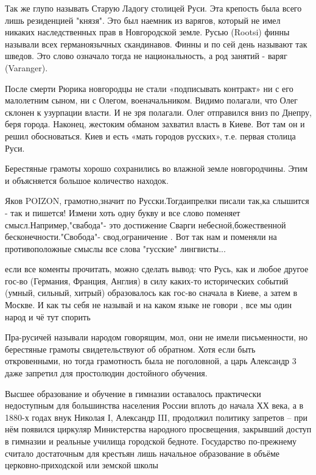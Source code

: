 \begin{itemize}
Так же глупо называть Старую Ладогу столицей Руси. Эта крепость была всего лишь
резиденцией "князя". Это был наемник из варягов, который не имел никаких
наследственных прав в Новгородской земле. Русью (Rootsi) финны называли всех
германоязычных скандинавов. Финны и по сей день называют так шведов. Это слово
означало тогда не национальность, а род занятий - варяг (Varanger).

После смерти Рюрика новгородцы не стали «подписывать контракт» ни с его
малолетним сыном, ни с Олегом, военачальником. Видимо полагали, что Олег
склонен к узурпации власти. И не зря полагали. Олег отправился вниз по Днепру,
беря города. Наконец, жестоким обманом захватил власть в Киеве. Вот там он и
решил обосноваться. Киев и есть «мать городов русских», т.е. первая столица
Руси.

Берестяные грамоты хорошо сохранились во влажной земле новгородчины. Этим и
объясняется большое количество находок.


Яков POIZON, грамотно,значит по Русски.Тогдаипрелки писали так,ка слышится -
так и пишется! Измени хоть одну букву и все слово поменяет
смысл.Например,"свабода"- это достижение Сварги небесной,божественной
бесконечности."Свобода"- свод,ограничение . Вот так нам и поменяли на
противоположные смыслы все слова "гусские" лингвисты...


если все коменты прочитать, можно сделать вывод: что Русь, как и любое другое
гос-во (Германия, Франция, Англия) в силу каких-то исторических событий (умный,
сильный, хитрый) образовалось как гос-во сначала в Киеве, а затем в Москве. И
как ты себя не называй и на каком языке не говори , все мы один народ и чё тут
спорить


Пра-русичей называли народом говорящим, мол, они не имели письменности, но
берестяные грамоты свидетельствуют об обратном. Хотя если быть откровенными, но
тогда грамотность была не поголовной, а царь Александр 3 даже запретил для
простолюдин достойного обучения.

Высшее образование и обучение в гимназии оставалось практически недоступным для
большинства населения России вплоть до начала ХХ века, а в 1880-х годах внук
Николая I, Александр III, продолжил политику запретов – при нём появился
циркуляр Министерства народного просвещения, закрывший доступ в гимназии и
реальные училища городской бедноте. Государство по-прежнему считало достаточным
для крестьян лишь начальное образование в объёме церковно-приходской или
земской школы


\end{itemize}
